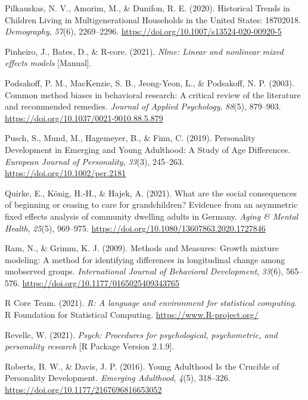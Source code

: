 \documentclass[
  english,
  man,floatsintext]{apa7}
\begin{document}
\leavevmode\hypertarget{ref-pilkauskasHistoricalTrendsChildren2020}{}%
Pilkauskas, N. V., Amorim, M., \& Dunifon, R. E. (2020). Historical Trends in Children Living in Multigenerational Households in the United States: 18702018. \emph{Demography}, \emph{57}(6), 2269--2296. \url{https://doi.org/10.1007/s13524-020-00920-5}

\leavevmode\hypertarget{ref-R-nlme}{}%
Pinheiro, J., Bates, D., \& R-core. (2021). \emph{Nlme: Linear and nonlinear mixed effects models} {[}Manual{]}.

\leavevmode\hypertarget{ref-podsakoffCommonMethodBiases2003}{}%
Podsakoff, P. M., MacKenzie, S. B., Jeong-Yeon, L., \& Podsakoff, N. P. (2003). Common method biases in behavioral research: A critical review of the literature and recommended remedies. \emph{Journal of Applied Psychology}, \emph{88}(5), 879--903. \url{https://doi.org/10.1037/0021-9010.88.5.879}

\leavevmode\hypertarget{ref-puschPersonalityDevelopmentEmerging2019}{}%
Pusch, S., Mund, M., Hagemeyer, B., \& Finn, C. (2019). Personality Development in Emerging and Young Adulthood: A Study of Age Differences. \emph{European Journal of Personality}, \emph{33}(3), 245--263. \url{https://doi.org/10.1002/per.2181}

\leavevmode\hypertarget{ref-quirkeWhatAreSocial2021}{}%
Quirke, E., König, H.-H., \& Hajek, A. (2021). What are the social consequences of beginning or ceasing to care for grandchildren? Evidence from an asymmetric fixed effects analysis of community dwelling adults in Germany. \emph{Aging \& Mental Health}, \emph{25}(5), 969--975. \url{https://doi.org/10.1080/13607863.2020.1727846}

\leavevmode\hypertarget{ref-ramMethodsMeasuresGrowth2009}{}%
Ram, N., \& Grimm, K. J. (2009). Methods and Measures: Growth mixture modeling: A method for identifying differences in longitudinal change among unobserved groups. \emph{International Journal of Behavioral Development}, \emph{33}(6), 565--576. \url{https://doi.org/10.1177/0165025409343765}

\leavevmode\hypertarget{ref-R-base}{}%
R Core Team. (2021). \emph{R: A language and environment for statistical computing}. R Foundation for Statistical Computing. \url{https://www.R-project.org/}

\leavevmode\hypertarget{ref-R-psych}{}%
Revelle, W. (2021). \emph{Psych: Procedures for psychological, psychometric, and personality research} {[}R Package Version 2.1.9{]}.

\leavevmode\hypertarget{ref-robertsYoungAdulthoodCrucible2016}{}%
Roberts, B. W., \& Davis, J. P. (2016). Young Adulthood Is the Crucible of Personality Development. \emph{Emerging Adulthood}, \emph{4}(5), 318--326. \url{https://doi.org/10.1177/2167696816653052}
\end{document}
